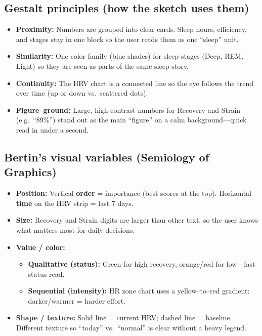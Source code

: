 \documentclass[11pt,a4paper]{article}
\begin{document}
\subsection{Gestalt principles (how the sketch uses them)}
\begin{itemize}[leftmargin=*]
  \item \textbf{Proximity:} Numbers are grouped into clear cards. Sleep hours, efficiency, and stages stay in one block so the user reads them as one ``sleep'' unit.
  \item \textbf{Similarity:} One color family (blue shades) for sleep stages (Deep, REM, Light) so they are seen as parts of the same sleep story.
  \item \textbf{Continuity:} The HRV chart is a connected line so the eye follows the trend over time (up or down vs.\ scattered dots).
  \item \textbf{Figure--ground:} Large, high-contrast numbers for Recovery and Strain (e.g.\ ``89\%'') stand out as the main ``figure'' on a calm background---quick read in under a second.
\end{itemize}

\subsection{Bertin's visual variables (Semiology of Graphics)}
\begin{itemize}[leftmargin=*]
  \item \textbf{Position:} Vertical \textbf{order} = importance (best scores at the top). Horizontal \textbf{time} on the HRV strip = last 7 days.
  \item \textbf{Size:} Recovery and Strain digits are larger than other text, so the user knows what matters most for daily decisions.
  \item \textbf{Value / color:}
    \begin{itemize}
      \item \textbf{Qualitative (status):} Green for high recovery, orange/red for low---fast status read.
      \item \textbf{Sequential (intensity):} HR zone chart uses a yellow--to--red gradient: darker/warmer = harder effort.
    \end{itemize}
  \item \textbf{Shape / texture:} Solid line = current HRV; dashed line = baseline. Different texture so ``today'' vs.\ ``normal'' is clear without a heavy legend.
\end{itemize}
\end{document}
